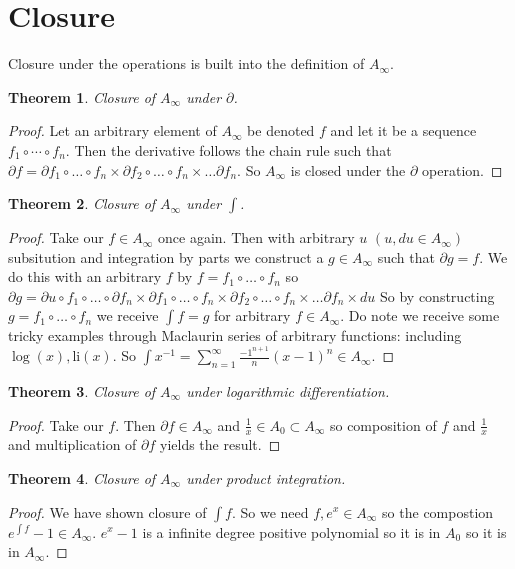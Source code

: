 \documentclass[10pt, oneside]{article}
\newtheorem{thm}{Theorem}
\begin{document}
\section{Closure}
   Closure under the operations is built into the definition of $A_\infty$.
   \begin{thm}
      Closure of $A_\infty$ under $\partial$.
   \end{thm}
   \begin{proof}
      Let an arbitrary element of $A_\infty$ be denoted $f$ and let it be a sequence $f_1 \circ \cdots \circ f_n$. 
      Then the derivative follows the chain rule such that $\partial f = \partial f_1 \circ \dots \circ f_n \times \partial f_2 \circ \dots \circ f_n \times \dots \partial f_n$. So $A_\infty$ is closed under the $\partial$ operation. 
   \end{proof}
   \begin{thm}
      Closure of $A_\infty$ under $\int$. 
   \end{thm}
   \begin{proof}
      Take our $f \in A_\infty$ once again. Then with arbitrary $u$ $(u, du \in A_{\infty})$ subsitution and integration by parts we construct a $g \in A_\infty$ such that $\partial g = f$. We do this with an arbitrary $f$ by $f = f_1 \circ \dots \circ f_n$ so $\partial g =  \partial u \circ f_1 \circ \dots \circ \partial f_n \times \partial f_1 \circ \dots \circ f_n \times \partial f_2 \circ \dots \circ f_n \times \dots \partial f_n \times du$
      So by constructing $g = f_1 \circ \dots \circ f_n$ we receive $\int f = g$ for arbitrary $f \in A_\infty$. Do note we receive some tricky examples through Maclaurin series of arbitrary functions: including $\log(x), \text{li}(x)$. So $\int x^{-1} = \sum_{n=1}^{\infty} \frac{-1^{n+1}}{n}(x-1)^n \in A_\infty$.
   \end{proof}
   \begin{thm}
      Closure of $A_\infty$ under logarithmic differentiation.
   \end{thm}
   \begin{proof}
      Take our $f$. Then $\partial f \in A_\infty$ and $\frac{1}{x} \in A_{0} \subset A_\infty$ so composition of $f$ and $\frac{1}{x}$ and multiplication of $\partial f$ yields the result.   
   \end{proof}
   \begin{thm}
      Closure of $A_\infty$ under product integration.
   \end{thm}
   \begin{proof}
      We have shown closure of $\int f$. So we need $f, e^x \in A_\infty$ so the compostion $e^{\int f} -1 \in A_{\infty}$. $e^x - 1$ is a infinite degree positive polynomial so it is in $A_0$ so it is in $A_\infty$.
   \end{proof}
\end{document}
